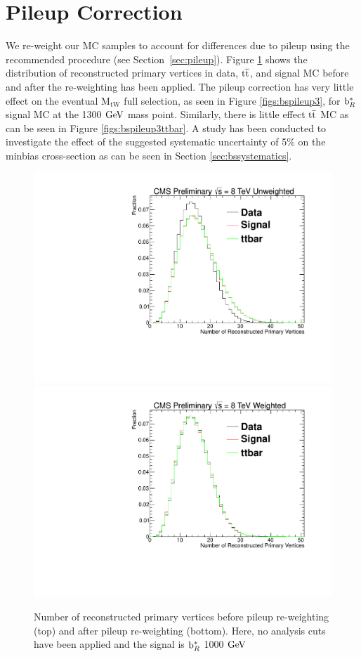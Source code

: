 \section{Pileup Correction}
\label{sec:bspileup}
We re-weight our MC samples to account for differences due to pileup using the recommended procedure (see Section~\ref{sec:pileup}).  
Figure \ref{figs:bsnpvweight} shows the distribution of reconstructed primary vertices in data, $\mathrm{t\overline{t}}$,
and signal MC before and after the re-weighting has been applied. The pileup correction has very little effect on the eventual $\mathrm{M_{tW}}$ 
full selection, as 
seen in Figure \ref{figs:bspileup3}, for $\mathrm{b}^{*}_R$ signal MC at the 1300$~\mathrm{GeV}$ mass point. Similarly, there is little effect 
$\mathrm{t\overline{t}}$ MC as can be seen in Figure \ref{figs:bspileup3ttbar}.  
A study has been conducted to investigate the effect of the suggested systematic uncertainty of 5\% on the minbias cross-section as can be seen in Section \ref{sec:bssystematics}.  


\begin{figure}
\begin{center}
\includegraphics[width=0.7\linewidth]{AN-14-049/figs/npvuw.pdf}\\
\includegraphics[width=0.7\linewidth]{AN-14-049/figs/npvw.pdf}
\end{center}
\caption{Number of reconstructed primary vertices before pileup re-weighting (top) and after pileup re-weighting (bottom).  Here, no analysis cuts have been applied and the signal is $\mathrm{b}^{*}_R$ 1000$~\mathrm{GeV}$}
\label{figs:bsnpvweight}
\end{figure}

